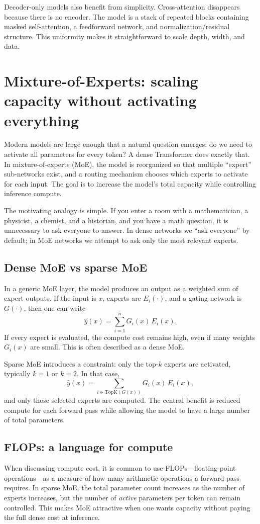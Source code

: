 Decoder-only models also benefit from simplicity. Cross-attention disappears because there is no encoder. The model is a stack of repeated blocks containing masked self-attention, a feedforward network, and normalization/residual structure. This uniformity makes it straightforward to scale depth, width, and data.

\section{Mixture-of-Experts: scaling capacity without activating everything}
Modern models are large enough that a natural question emerges: do we need to activate all parameters for every token? A dense Transformer does exactly that. In mixture-of-experts (MoE), the model is reorganized so that multiple “expert” sub-networks exist, and a routing mechanism chooses which experts to activate for each input. The goal is to increase the model’s total capacity while controlling inference compute.

The motivating analogy is simple. If you enter a room with a mathematician, a physicist, a chemist, and a historian, and you have a math question, it is unnecessary to ask everyone to answer. In dense networks we “ask everyone” by default; in MoE networks we attempt to ask only the most relevant experts.

\subsection{Dense MoE vs sparse MoE}
In a generic MoE layer, the model produces an output as a weighted sum of expert outputs. If the input is \(x\), experts are \(E_i(\cdot)\), and a gating network is \(G(\cdot)\), then one can write
\[
\hat{y}(x) = \sum_{i=1}^n G_i(x)\,E_i(x).
\]
If every expert is evaluated, the compute cost remains high, even if many weights \(G_i(x)\) are small. This is often described as a dense MoE.

Sparse MoE introduces a constraint: only the top-\(k\) experts are activated, typically \(k=1\) or \(k=2\). In that case,
\[
\hat{y}(x) = \sum_{i\in \mathrm{TopK}(G(x))} G_i(x)\,E_i(x),
\]
and only those selected experts are computed. The central benefit is reduced compute for each forward pass while allowing the model to have a large number of total parameters.

\subsection{FLOPs: a language for compute}
When discussing compute cost, it is common to use FLOPs—floating-point operations—as a measure of how many arithmetic operations a forward pass requires. In sparse MoE, the total parameter count increases as the number of experts increases, but the number of \emph{active} parameters per token can remain controlled. This makes MoE attractive when one wants capacity without paying the full dense cost at inference.

